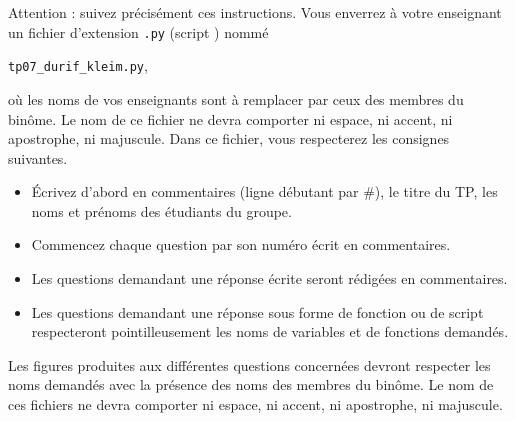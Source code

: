 Attention : suivez précisément ces instructions. Vous enverrez à votre enseignant un fichier d'extension  \texttt{.py} (script \python) nommé
\begin{center}
  \texttt{tp07\_durif\_kleim.py},
\end{center}
 où les noms de vos enseignants sont à remplacer par ceux des membres du binôme. Le nom de ce 
fichier ne devra comporter ni espace, ni accent, ni apostrophe, ni majuscule.
Dans ce fichier, vous respecterez les consignes suivantes.
\begin{itemize}
  \item \'Ecrivez d'abord en commentaires (ligne débutant par \#), le titre du TP, les noms et prénoms des étudiants du groupe.
  \item Commencez chaque question par son numéro écrit en commentaires.
  \item Les questions demandant une réponse écrite seront rédigées en commentaires.
  \item Les questions demandant une réponse sous forme de fonction ou de script respecteront pointilleusement les noms de variables et de fonctions demandés.
\end{itemize}


Les figures produites aux différentes questions concernées devront respecter les noms demandés avec la présence des noms des membres du binôme. Le nom de ces fichiers ne devra comporter ni espace, ni accent, ni apostrophe, ni majuscule. 

